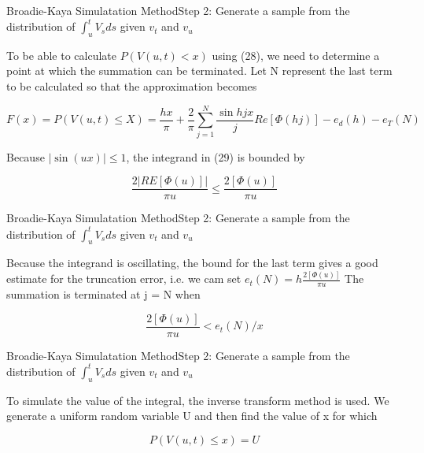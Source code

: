 \begin{frame}{Broadie-Kaya Simulatation Method}{Step 2:  Generate a sample from the distribution of $\int_{u}^t V_s ds$ given $v_t$ and $v_u$}


    To be able to calculate $P(V(u, t) < x )$ using (28), we
    need to determine a point at which the summation can be
    terminated. Let N represent the last term to be calculated
    so that the approximation becomes

     \begin{equation}
        F(x) = P(V(u, t) \leq X) = \frac{hx}{\pi} + \frac{2}{\pi} \sum_{j=1}^N \frac{\sin hjx}{j} Re[\Phi(hj)] - e_d(h) - e_T(N)
    \end{equation}

    Because $|\sin(ux)| \leq 1$, the integrand in (29) is bounded by
     
    \begin{equation}
        \frac{2|RE[\Phi(u)]|}{\pi u} \leq \frac{2[\Phi(u)]}{\pi u}
    \end{equation}

    

\end{frame}

\begin{frame}{Broadie-Kaya Simulatation Method}{Step 2:  Generate a sample from the distribution of $\int_{u}^t V_s ds$ given $v_t$ and $v_u$}
    
    Because the integrand is oscillating, the bound for the last term gives a good estimate for the truncation error, i.e. we cam set $e_t(N) = h \frac{2[\Phi(u)]}{\pi u} $ The summation is terminated at j = N when

    \begin{equation}
        \frac{2[\Phi(u)]}{\pi u} < e_t(N)/x
     \end{equation}
    
\end{frame}



\begin{frame}{Broadie-Kaya Simulatation Method}{Step 2:  Generate a sample from the distribution of $\int_{u}^t V_s ds$ given $v_t$ and $v_u$}

    
    To simulate the value of the integral, the inverse transform method is used. We generate a uniform random variable U and then find the value of x for which 

    \begin{equation}
        P(V(u, t) \leq x) = U
    \end{equation}

\end{frame}


